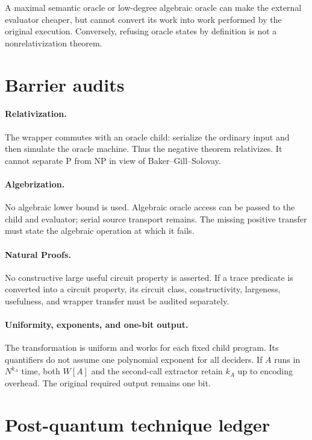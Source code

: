 \documentclass[11pt]{article}
\begin{document}
A maximal semantic oracle or low-degree algebraic oracle can make the
external evaluator cheaper, but cannot convert its work into work performed
by the original execution.  Conversely, refusing oracle states by definition
is not a nonrelativization theorem.

\section{Barrier audits}

\paragraph{Relativization.}
The wrapper commutes with an oracle child: serialize the ordinary input and
then simulate the oracle machine.  Thus the negative theorem relativizes.  It
cannot separate P from NP in view of Baker--Gill--Solovay.

\paragraph{Algebrization.}
No algebraic lower bound is used.  Algebraic oracle access can be passed to
the child and evaluator; serial source transport remains.  The missing
positive transfer must state the algebraic operation at which it fails.

\paragraph{Natural Proofs.}
No constructive large useful circuit property is asserted.  If a trace
predicate is converted into a circuit property, its circuit class,
constructivity, largeness, usefulness, and wrapper transfer must be audited
separately.

\paragraph{Uniformity, exponents, and one-bit output.}
The transformation is uniform and works for each fixed child program.  Its
quantifiers do not assume one polynomial exponent for all deciders.  If $A$
runs in $N^{k_A}$ time, both $W[A]$ and the second-call extractor retain
$k_A$ up to encoding overhead.  The original required output remains one bit.

\section{Post-quantum technique ledger}
\end{document}
